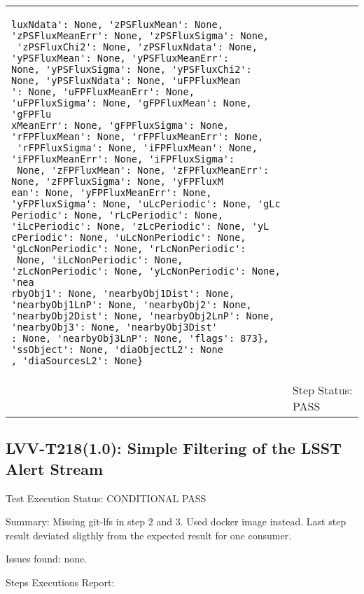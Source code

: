 \documentclass[DM,lsstdraft,STR,toc]{lsstdoc}
\begin{document}
\begin{longtable}{p{2cm}p{14cm}}
{\begin{verbatim}
luxNdata': None, 'zPSFluxMean': None, 'zPSFluxMeanErr': None, 'zPSFluxSigma': None,
 'zPSFluxChi2': None, 'zPSFluxNdata': None, 'yPSFluxMean': None, 'yPSFluxMeanErr': 
None, 'yPSFluxSigma': None, 'yPSFluxChi2': None, 'yPSFluxNdata': None, 'uFPFluxMean
': None, 'uFPFluxMeanErr': None, 'uFPFluxSigma': None, 'gFPFluxMean': None, 'gFPFlu
xMeanErr': None, 'gFPFluxSigma': None, 'rFPFluxMean': None, 'rFPFluxMeanErr': None,
 'rFPFluxSigma': None, 'iFPFluxMean': None, 'iFPFluxMeanErr': None, 'iFPFluxSigma':
 None, 'zFPFluxMean': None, 'zFPFluxMeanErr': None, 'zFPFluxSigma': None, 'yFPFluxM
ean': None, 'yFPFluxMeanErr': None, 'yFPFluxSigma': None, 'uLcPeriodic': None, 'gLc
Periodic': None, 'rLcPeriodic': None, 'iLcPeriodic': None, 'zLcPeriodic': None, 'yL
cPeriodic': None, 'uLcNonPeriodic': None, 'gLcNonPeriodic': None, 'rLcNonPeriodic':
 None, 'iLcNonPeriodic': None, 'zLcNonPeriodic': None, 'yLcNonPeriodic': None, 'nea
rbyObj1': None, 'nearbyObj1Dist': None, 'nearbyObj1LnP': None, 'nearbyObj2': None, 
'nearbyObj2Dist': None, 'nearbyObj2LnP': None, 'nearbyObj3': None, 'nearbyObj3Dist'
: None, 'nearbyObj3LnP': None, 'flags': 873}, 'ssObject': None, 'diaObjectL2': None
, 'diaSourcesL2': None}
\end{verbatim}
}
 \\\cline{2-2}
  & Step Status: PASS \\\hline
\end{longtable}




\subsection{LVV-T218(1.0): Simple Filtering of the LSST Alert Stream}
\label{sect:detail-lvv-t216}

Test Execution Status: CONDITIONAL PASS

Summary: Missing git-lfs in step 2 and 3. Used docker image instead. Last step result deviated sligthly from the expected result for one consumer.

Issues found: none.

Steps Executions Report:
\end{document}
